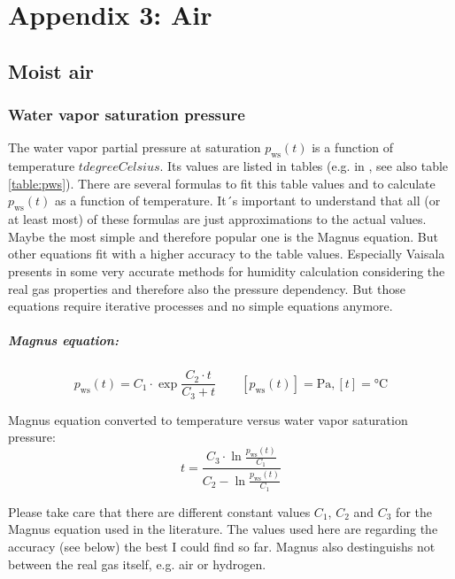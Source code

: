 \documentclass[11pt,a4paper,english,twoside]{scrreprt}
\begin{document}
\chapter{Appendix 3: Air}

\section{Moist air}
\label{chap:Moist air}

\subsection{Water vapor saturation pressure}

The water vapor partial pressure at saturation $p_\text{ws}(t)$ is a function of temperature $t\si{degreeCelsius}$. Its values are listed in tables (e.g. in \cite{HCP}, see also table \ref{table:pws}). There are several formulas to fit this table values and to calculate $p_\text{ws}(t)$ as a function of temperature. It´s important to understand that all (or at least most) of these formulas are just approximations to the actual values. Maybe the most simple and therefore popular one is the Magnus equation. But other equations fit with a higher accuracy to the table values. Especially Vaisala presents in \cite{lit:Vaisala} some very accurate methods for humidity calculation considering the real gas properties and therefore also the pressure dependency. But those equations require iterative processes and no simple equations anymore. 

\paragraph{Magnus equation:}

\begin{equation}
  \label{eqn:Magnus}
  p_\text{ws}(t) =C_1 \cdot \exp \frac{C_2 \cdot t}{C_3 +t} \qquad [p_\text{ws}(t)] = \si{\pascal}, [t] = \si{\degreeCelsius} 
\end{equation}  

Magnus equation converted to temperature versus water vapor saturation pressure:
\[t=\frac{C_3 \cdot \ln \frac{p_\text{ws}(t)}{C_1}}{C_2 -\ln \frac{p_\text{ws}(t)}{C_1}}\]

Please take care that there are different constant values $C_1$, $C_2$ and $C_3$ for the Magnus equation used in the literature. The values used here are regarding the accuracy (see below) the best I could find so far. Magnus also destinguishs not between the real gas itself, e.g. air or hydrogen.
\end{document}
